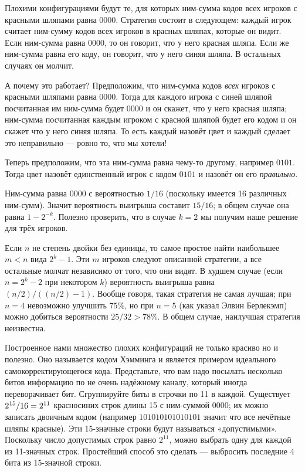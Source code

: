 Плохими конфигурациями будут те, для которых ним-сумма кодов всех игроков с красными шляпами равна $0000$.
Стратегия состоит в следующем: каждый игрок считает ним-сумму кодов всех игроков в красных шляпах, которые он видит.
Если ним-сумма равна $0000$, то он говорит, что у него красная шляпа.
Если же ним-сумма равна его коду, он говорит, что у него синяя шляпа.
В остальных случаях он молчит.

А почему это работает?
Предположим, что ним-сумма кодов \emph{всех} игроков с красными шляпами равна $0000$.
Тогда для каждого игрока с синей шляпой посчитанная им ним-сумма будет $0000$ и он скажет, что у него красная шляпа;
ним-сумма посчитанная каждым игроком с красной шляпой будет его кодом и он скажет что у него синяя шляпа.
То есть каждый назовёт цвет и каждый сделает это неправильно --- ровно то, что мы хотели!

Теперь  предположим, что эта ним-сумма равна чему-то другому, например $0101$.
Тогда цвет назовёт единственный игрок с кодом  $0101$ и назовёт он его \emph{правильно}.

Ним-сумма равна $0000$ с вероятностью $1/16$ (поскольку имеется 16 различных ним-сумм).
Значит вероятность выигрыша составит $15/16$;
в общем случае она равна $1-2^{-k}$.
Полезно проверить, что в случае $k=2$ мы получим наше решение для трёх игроков.

Если $n$ не степень двойки без единицы, то самое простое найти наибольшее $m<n$ вида $2^k-1$.
Эти $m$ игроков следуют описанной стратегии, а все остальные молчат независимо от того, что они видят.
В худшем случае (если $n=2^k-2$ при некотором $k$) вероятность выигрыша равна $(n/2)/((n/2)-1)$.
Вообще говоря, такая стратегия не самая лучшая;
при $n=4$ невозможно улучшить $75\%$, но при $n=5$ (как указал Элвин Берлекэмп) можно добиться вероятности $25/32>78\%$.
В общем случае, наилучшая стратегия неизвестна.
\heart

Построенное нами множество плохих конфигураций не только красиво но и полезно.
Оно называется кодом Хэмминга и является примером идеального самокорректирующегося кода.
Представьте, что вам надо посылать несколько битов информацию по не очень надёжному каналу, который иногда переворачивает бит.
Сгруппируйте биты в строчки по 11 в каждой.
Существует $2^{15}/16\z=2^{11}$ красносиних строк длины 15 с ним-суммой $0000$;
их можно записать двоичным кодом (например $101010101010101$ значит что все нечётные шляпы красные).
Эти 15-значные строки будут называться «допустимыми».
Поскольку число допустимых строк равно $2^{11}$, можно выбрать одну для каждой из 11-значных строк.
Простейший способ это сделать --- выбросить последние 4 бита из 15-значной строки.

